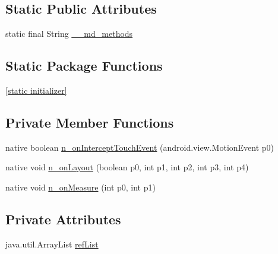 \subsection*{Static Public Attributes}
\begin{CompactItemize}
\item 
static final String \hyperlink{classmd5b60ffeb829f638581ab2bb9b1a7f4f3f_1_1_view_cell_renderer___view_cell_container_1f62af5d260be844bb21e32402dd820b}{\_\-\_\-md\_\-methods}
\end{CompactItemize}
\subsection*{Static Package Functions}
\begin{CompactItemize}
\item 
\hyperlink{classmd5b60ffeb829f638581ab2bb9b1a7f4f3f_1_1_view_cell_renderer___view_cell_container_8e7d5ca23a28795184e745f4a655544f}{\mbox{[}static initializer\mbox{]}}
\end{CompactItemize}
\subsection*{Private Member Functions}
\begin{CompactItemize}
\item 
native boolean \hyperlink{classmd5b60ffeb829f638581ab2bb9b1a7f4f3f_1_1_view_cell_renderer___view_cell_container_c4d076bd301b00fc1b70cfc2f19ba95f}{n\_\-onInterceptTouchEvent} (android.view.MotionEvent p0)
\item 
native void \hyperlink{classmd5b60ffeb829f638581ab2bb9b1a7f4f3f_1_1_view_cell_renderer___view_cell_container_925a68f0ccfb7b59829a006aba8ff5f6}{n\_\-onLayout} (boolean p0, int p1, int p2, int p3, int p4)
\item 
native void \hyperlink{classmd5b60ffeb829f638581ab2bb9b1a7f4f3f_1_1_view_cell_renderer___view_cell_container_96ae769d8ff675310d41cbe5291e3424}{n\_\-onMeasure} (int p0, int p1)
\end{CompactItemize}
\subsection*{Private Attributes}
\begin{CompactItemize}
\item 
java.util.ArrayList \hyperlink{classmd5b60ffeb829f638581ab2bb9b1a7f4f3f_1_1_view_cell_renderer___view_cell_container_28b975f2cd679e8f5307b875c6f704f7}{refList}
\end{CompactItemize}


